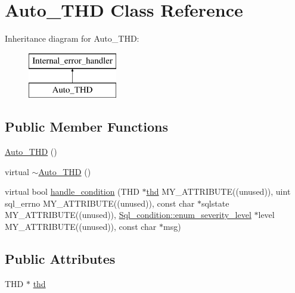 \hypertarget{classAuto__THD}{}\section{Auto\+\_\+\+T\+HD Class Reference}
\label{classAuto__THD}
Inheritance diagram for Auto\+\_\+\+T\+HD\+:\begin{figure}[H]
\begin{center}
\leavevmode
\includegraphics[height=2.000000cm]{classAuto__THD}
\end{center}
\end{figure}
\subsection*{Public Member Functions}
\begin{DoxyCompactItemize}
\item 
\mbox{\hyperlink{classAuto__THD_a5ef40c83a177d76114d81e4d9c11ad24}{Auto\+\_\+\+T\+HD}} ()
\item 
virtual \mbox{\hyperlink{classAuto__THD_ad3979645f490d97394a84be0566725bc}{$\sim$\+Auto\+\_\+\+T\+HD}} ()
\item 
virtual bool \mbox{\hyperlink{classAuto__THD_a51b7090f1f17ce96bab94971097820e4}{handle\+\_\+condition}} (T\+HD $\ast$\mbox{\hyperlink{classAuto__THD_a4d4c17d3fc81e0db889f401a7493f961}{thd}} M\+Y\+\_\+\+A\+T\+T\+R\+I\+B\+U\+TE((unused)), uint sql\+\_\+errno M\+Y\+\_\+\+A\+T\+T\+R\+I\+B\+U\+TE((unused)), const char $\ast$sqlstate M\+Y\+\_\+\+A\+T\+T\+R\+I\+B\+U\+TE((unused)), \mbox{\hyperlink{classSql__condition_ab0602581e19cddb609bfe10c44be4e83}{Sql\+\_\+condition\+::enum\+\_\+severity\+\_\+level}} $\ast$level M\+Y\+\_\+\+A\+T\+T\+R\+I\+B\+U\+TE((unused)), const char $\ast$msg)
\end{DoxyCompactItemize}
\subsection*{Public Attributes}
\begin{DoxyCompactItemize}
\item 
T\+HD $\ast$ \mbox{\hyperlink{classAuto__THD_a4d4c17d3fc81e0db889f401a7493f961}{thd}}
\end{DoxyCompactItemize}


